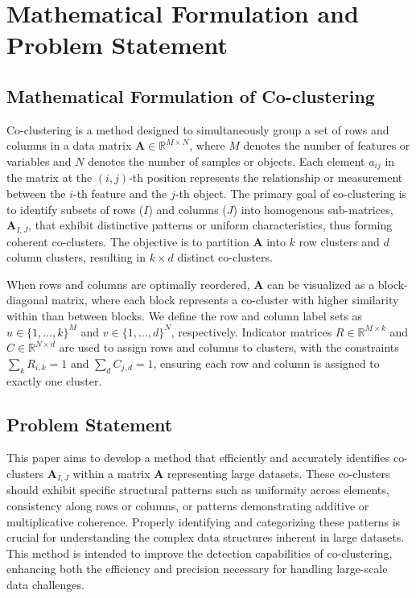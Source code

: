 
 \section{Mathematical Formulation and Problem Statement}\label{sec:formula}
\subsection{Mathematical Formulation of Co-clustering}
Co-clustering is a method designed to simultaneously group a set of rows and columns in a data matrix $\mathbf{A} \in \mathbb{R}^{M \times N}$, where $M$ denotes the number of features or variables and $N$ denotes the number of samples or objects. Each element $a_{ij}$ in the matrix at the $(i, j)$-th position represents the relationship or measurement between the $i$-th feature and the $j$-th object. The primary goal of co-clustering is to identify subsets of rows ($I$) and columns ($J$) into homogenous sub-matrices, $\mathbf{A}_{I, J}$, that exhibit distinctive patterns or uniform characteristics, thus forming coherent co-clusters. The objective is to partition $\mathbf{A}$ into $k$ row clusters and $d$ column clusters, resulting in $k \times d$ distinct co-clusters.

When rows and columns are optimally reordered, $\mathbf{A}$ can be visualized as a block-diagonal matrix, where each block represents a co-cluster with higher similarity within than between blocks. We define the row and column label sets as \( u \in \{1,\dots,k\}^M \) and \( v \in \{1,\dots,d\}^N \), respectively. Indicator matrices \( R \in \mathbb{R}^{M \times k} \) and \( C \in \mathbb{R}^{N \times d} \) are used to assign rows and columns to clusters, with the constraints \( \sum_k R_{i,k} = 1 \) and \( \sum_d C_{j,d} = 1 \), ensuring each row and column is assigned to exactly one cluster.
 
\subsection{Problem Statement}
This paper aims to develop a method that efficiently and accurately identifies co-clusters $\mathbf{A}_{I, J}$ within a matrix $\mathbf{A}$ representing large datasets. These co-clusters should exhibit specific structural patterns such as uniformity across elements, consistency along rows or columns, or patterns demonstrating additive or multiplicative coherence. Properly identifying and categorizing these patterns is crucial for understanding the complex data structures inherent in large datasets. This method is intended to improve the detection capabilities of co-clustering, enhancing both the efficiency and precision necessary for handling large-scale data challenges.


